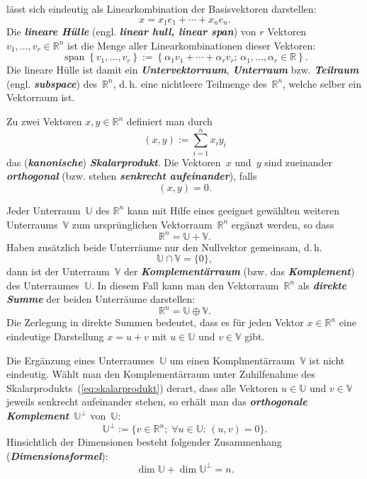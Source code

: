 lässt sich eindeutig als Linearkombination der Basisvektoren darstellen:
\[
x=x_{1}e_{1}+\cdots+x_{n}e_{n}.
\]
Die \textbf{\em lineare Hülle} (engl. \textbf{\em linear
hull, linear span}) von $r$ Vektoren $v_{1},\ldots,v_{r}\in{\mathbb{R}}^{n}$
ist die Menge aller Linearkombinationen dieser Vektoren:
\[
{\operatorname{span}}\left\{ v_{1},\ldots,v_{r}\right\} :=\left\{ \alpha_{1}v_{1}+\cdots+\alpha_{r}v_{r};\,\alpha_{1},\ldots,\alpha_{r}\in{\mathbb{R}}\right\} .
\]
Die lineare Hülle ist damit ein \textbf{\em Untervektorraum}, \textbf{\em Unterraum}
bzw. \textbf{\em Teilraum} (engl. \textbf{\em subspace}) des~${\mathbb{R}}^{n}$, d.\,h.
eine nichtleere Teilmenge des~${\mathbb{R}}^{n}$, welche selber ein Vektorraum
ist.

Zu zwei Vektoren $x,y\in{\mathbb{R}}^{n}$ definiert man durch
\begin{equation}
(x,y):=\sum_{i=1}^{n}x_{i}y_{i}\label{eq:skalarprodukt}
\end{equation}
das (\textbf{\em kanonische}) \textbf{\em Skalarprodukt}.
Die Vektoren~$x$ und~$y$ sind zueinander \textbf{\em orthogonal} (bzw.
stehen \textbf{\em senkrecht aufeinander}), falls
\[
(x,y)=0.
\]

Jeder Unterraum~$\mathbb{U}$ des ${\mathbb{R}}^{n}$ kann mit Hilfe eines
geeignet gewählten weiteren Unterraums~$\mathbb{V}$ zum ursprünglichen
Vektorraum~${\mathbb{R}}^{n}$ ergänzt werden, so dass
\[
{\mathbb{R}}^{n}=\mathbb{U}+\mathbb{V}.
\]
Haben zusätzlich beide Unterräume nur den Nullvektor gemeinsam, d.\,h.
\[
\mathbb{U}\cap\mathbb{V}=\{0\},
\]
dann ist der Unterraum~$\mathbb{V}$ der \textbf{\em Komplementärraum}
(bzw. das \textbf{\em Komplement}) des Unterraumes~$\mathbb{U}$. In diesem
Fall kann man den Vektorraum~${\mathbb{R}}^{n}$ als \textbf{\em direkte Summe} der
beiden Unterräume darstellen:
\[
{\mathbb{R}}^{n}=\mathbb{U}\oplus\mathbb{V}.
\]
Die Zerlegung in direkte Summen bedeutet, dass es für jeden Vektor
$x\in{\mathbb{R}}^{n}$ eine eindeutige Darstellung $x=u+v$ mit $u\in\mathbb{U}$
und $v\in\mathbb{V}$ gibt.

Die Ergänzung eines Unterraumes~$\mathbb{U}$ um einen Komplmentärraum~$\mathbb{V}$
ist nicht eindeutig. Wählt man den Komplementärraum unter Zuhilfenahme
des Skalarprodukts~(\ref{eq:skalarprodukt}) derart, dass alle Vektoren
$u\in\mathbb{U}$ und $v\in\mathbb{V}$ jeweils senkrecht aufeinander
stehen, so erhält man das \textbf{\em orthogonale Komplement}~$\mathbb{U}^{\perp}$
von~$\mathbb{U}$:
\begin{equation}
\mathbb{U}^{\perp}:=\{v\in{\mathbb{R}}^{n};\;\forall u\in\mathbb{U}:\,(u,v)=0\}.\label{eq:ortho-komplement}
\end{equation}
Hinsichtlich der Dimensionen besteht folgender Zusammenhang (\textbf{\em Dimensionsformel}):
\begin{equation}
\dim\mathbb{U}+\dim\mathbb{U}^{\perp}=n.\label{eq:dimensionsformel-ortho-kompl}
\end{equation}

